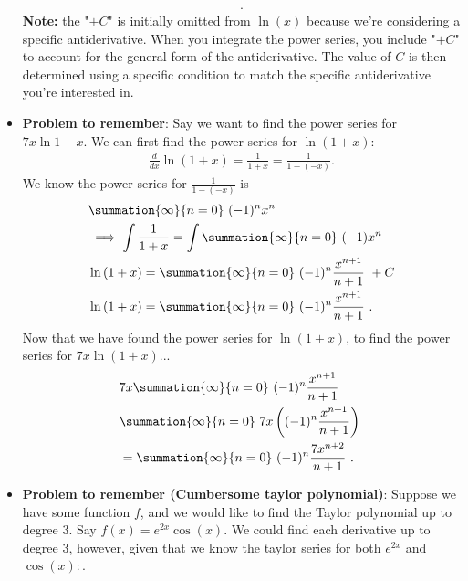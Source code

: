 \documentclass{report}
\begin{document}
\begin{itemize}
\begin{align*}
                .\end{align*}
                \textbf{Note:} the "$+C$" is initially omitted from $\ln{(x)}$ because we're considering a specific antiderivative. When you integrate the power series, you include "$+C$" to account for the general form of the antiderivative. The value of  $C$ is then determined using a specific condition to match the specific antiderivative you're interested in.
            \item \textbf{Problem to remember}: Say we want to find the power series for $7x\ln{1+x}$. We can first find the power series for $\ln{(1+x)}: $
                \begin{align*}
                    \frac{d}{dx} \ln{(1+x)} = \frac{1}{1+x} = \frac{1}{1-(-x)}
                .\end{align*}
                We know the power series for  $\frac{1}{1-(-x)} $ is
                \begin{align*}
                    &\summation{\infty}{n=0}\ (-1)^{n}x^{n}\  \\
                    &\implies \int \frac{1}{1+x} = \int \summation{\infty}{n=0}\ (-1)x^{n}\   \\
                    &\ln{(1+x)} = \summation{\infty}{n=0}\ (-1)^{n}\frac{x^{n+1}}{n+1}\  + C  \\
                    &\ln{(1+x)} = \summation{\infty}{n=0}\ (-1)^{n}\frac{x^{n+1}}{n+1}\ 
                .\end{align*}
                Now that we have found the power series for $\ln{(1+x)}$, to find the power series for $7x\ln{(1+x)}$...
                \begin{align*}
                    &7x\summation{\infty}{n=0}\ (-1)^{n}\frac{x^{n+1}}{n+1}\  \\
                    &\summation{\infty}{n=0}\ 7x\left((-1)^{n}\frac{x^{n+1}}{n+1}\right)\  \\
                    &=\summation{\infty}{n=0}\ (-1)^{n}\frac{7x^{n+2}}{n+1}\ 
                .\end{align*}
                \pagebreak \bigbreak \noindent 
            \item \textbf{Problem to remember (Cumbersome taylor polynomial)}: Suppose we have some function $f$, and we would like to find the Taylor polynomial up to degree $3$. Say $f(x) = e^{2x}\cos{(x)}$. We could find each derivative up to degree 3, however, given that we know the taylor series for both $e^{2x}$ and $\cos{(x)}:$.
                \begin{align*}

\end{align*}
\end{itemize}
\end{document}
